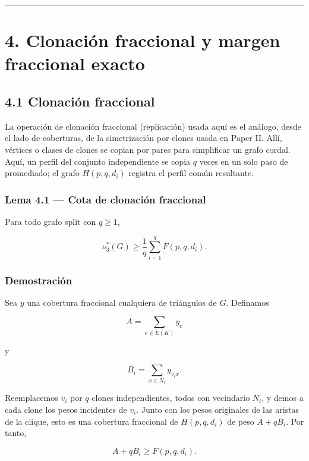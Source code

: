 \documentclass[
  spanish,
  11pt,
  a4paper,
]{article}
\begin{document}
\begin{center}\rule{0.5\linewidth}{0.5pt}\end{center}

\section{4. Clonación fraccional y margen fraccional exacto}\label{clonaciuxf3n-fraccional-y-margen-fraccional-exacto}

\subsection{4.1 Clonación fraccional}\label{clonaciuxf3n-fraccional}

La operación de clonación fraccional (replicación) usada aquí es el análogo, desde el lado de coberturas, de la simetrización por clones usada en Paper II. Allí, vértices o clases de clones se copian por pares para simplificar un grafo cordal. Aquí, un perfil del conjunto independiente se copia \(q\) veces en un solo paso de promediado; el grafo \(H(p,q,d_i)\) registra el perfil común resultante.

\subsubsection{Lema 4.1 --- Cota de clonación fraccional}\label{lema-4.1-cota-de-clonaciuxf3n-fraccional}

Para todo grafo split con \(q\ge1\),

\[
\boxed{
\nu_3^*(G)
\ge
\frac1q\sum_{i=1}^qF(p,q,d_i).
}
\tag{4.1}
\]

\subsubsection{Demostración}\label{demostraciuxf3n-1}

Sea \(y\) una cobertura fraccional cualquiera de triángulos de \(G\). Definamos

\[
A=\sum_{e\in E(K)}y_e
\]

y

\[
B_i=\sum_{x\in N_i}y_{v_ix}.
\]

Reemplacemos \(v_i\) por \(q\) clones independientes, todos con vecindario \(N_i\), y demos a cada clone los pesos incidentes de \(v_i\). Junto con los pesos originales de las aristas de la clique, esto es una cobertura fraccional de \(H(p,q,d_i)\) de peso \(A+qB_i\). Por tanto,

\[
A+qB_i\ge F(p,q,d_i).
\]
\end{document}
